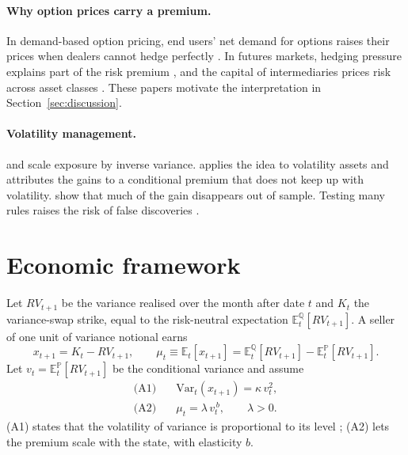 \documentclass[11pt,a4paper]{article}
\theoremstyle{remark}
\newcommand{\E}{\mathbb{E}}
\newcommand{\Var}{\mathrm{Var}}
\begin{document}
\paragraph{Why option prices carry a premium.} In demand-based option pricing, end users' net demand for options raises their prices when dealers cannot hedge perfectly \citep{bollenwhaley2004,garleanu2009}. In futures markets, hedging pressure explains part of the risk premium \citep{deroon2000}, and the capital of intermediaries prices risk across asset classes \citep{hekellymanela2017}. These papers motivate the interpretation in Section~\ref{sec:discussion}.

\paragraph{Volatility management.} \citet{moreiramuir2017} and \citet{barroso2015} scale exposure by inverse variance. \citet{yang2024} applies the idea to volatility assets and attributes the gains to a conditional premium that does not keep up with volatility. \citet{cederburg2020} show that much of the gain disappears out of sample. Testing many rules raises the risk of false discoveries \citep{white2000,hansen2005,romanowolf2005,harvey2016}.

\section{Economic framework}
\label{sec:theory}

Let $RV_{t+1}$ be the variance realised over the month after date $t$ and $K_t$ the variance-swap strike, equal to the risk-neutral expectation $\E^{\mathbb{Q}}_t[RV_{t+1}]$. A seller of one unit of variance notional earns
\begin{equation}
x_{t+1} = K_t - RV_{t+1},
\qquad
\mu_t \equiv \E_t[x_{t+1}] = \E^{\mathbb{Q}}_t[RV_{t+1}] - \E^{\mathbb{P}}_t[RV_{t+1}].
\label{eq:x}
\end{equation}
Let $v_t = \E^{\mathbb{P}}_t[RV_{t+1}]$ be the conditional variance and assume
\begin{align}
\text{(A1)}\quad & \Var_t(x_{t+1}) = \kappa\, v_t^{2}, \label{eq:a1}\\
\text{(A2)}\quad & \mu_t = \lambda\, v_t^{\,b}, \qquad \lambda>0. \label{eq:a2}
\end{align}
(A1) states that the volatility of variance is proportional to its level \citep{andersen2003}; (A2) lets the premium scale with the state, with elasticity $b$.
\end{document}
